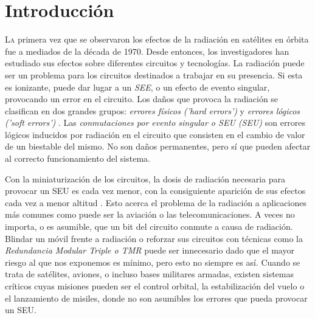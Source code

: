 \chapter{Introducción}
\label{ch:Introduccion}

\lettrine[lraise=-0.1, lines=2, loversize=0.2]{L}{a} primera vez que se observaron
los efectos de la radiación en satélites en órbita fue a mediados de la década de
1970. Desde entonces, los investigadores han estudiado sus efectos sobre
diferentes circuitos y tecnologías. La radiación puede ser un problema para los
circuitos destinados a trabajar en su presencia. Si esta es ionizante, puede dar
lugar a un \textit{\gls{SEE}}, o un efecto de evento singular, provocando un error 
en el circuito. Los daños que provoca la radiación se clasifican en dos grandes 
grupos: \textit{errores físicos ('hard errors')} y \textit{errores lógicos ('soft
errors')} \cite{TesisPoli}. Las \textit{conmutaciones por evento singular o 
\acrlong{SEU} (\acrshort{SEU})} son errores lógicos inducidos por radiación en el 
circuito que consisten en el cambio de valor de un biestable del mismo. No son 
daños permanentes, pero sí que pueden afectar al correcto funcionamiento del 
sistema.

Con la miniaturización de los circuitos, la dosis de radiación necesaria para 
provocar un \gls{SEU} es cada vez menor, con la consiguiente aparición de sus 
efectos cada vez a menor altitud \cite{EDN}. Esto acerca el problema de la 
radiación a aplicaciones más comunes como puede ser la aviación o las 
telecomunicaciones. A veces no importa, o es asumible, que un bit del circuito 
conmute a causa de radiación. Blindar un móvil frente a radiación o reforzar sus
circuitos con técnicas como la \textit{Redundancia Modular Triple o \gls{TMR}}
\cite{TMR} puede ser innecesario dado que el mayor riesgo al que nos exponemos es 
mínimo, pero esto no siempre es así. Cuando se trata de satélites, aviones, o 
incluso bases militares armadas, existen sistemas críticos cuyas misiones pueden 
ser el control orbital, la estabilización del vuelo o el lanzamiento de misiles, 
donde no son asumibles los errores que pueda provocar un \gls{SEU}.

